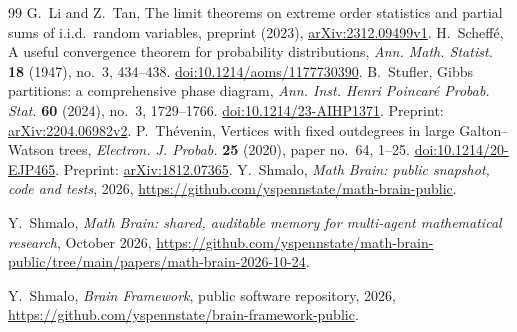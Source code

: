 \begin{thebibliography}{99}
 G.~Li and Z.~Tan, The limit theorems on extreme order statistics and partial sums of i.i.d.\ random variables, preprint (2023), \href{https://arxiv.org/abs/2312.09499v1}{arXiv:2312.09499v1}.
 H.~Scheff\'e, A useful convergence theorem for probability distributions, \emph{Ann. Math. Statist.} \textbf{18} (1947), no.~3, 434--438. \href{https://doi.org/10.1214/aoms/1177730390}{doi:10.1214/aoms/1177730390}.
 B.~Stufler, Gibbs partitions: a comprehensive phase diagram, \emph{Ann. Inst. Henri Poincar\'e Probab. Stat.} \textbf{60} (2024), no.~3, 1729--1766. \href{https://doi.org/10.1214/23-AIHP1371}{doi:10.1214/23-AIHP1371}. Preprint: \href{https://arxiv.org/abs/2204.06982}{arXiv:2204.06982v2}.
 P.~Th\'evenin, Vertices with fixed outdegrees in large Galton--Watson trees, \emph{Electron. J. Probab.} \textbf{25} (2020), paper no.~64, 1--25. \href{https://doi.org/10.1214/20-EJP465}{doi:10.1214/20-EJP465}. Preprint: \href{https://arxiv.org/abs/1812.07365}{arXiv:1812.07365}.
 Y.~Shmalo, \emph{Math Brain: public snapshot, code and tests}, 2026, \url{https://github.com/yspennstate/math-brain-public}.

 Y.~Shmalo, \emph{Math Brain: shared, auditable memory for multi-agent mathematical research}, October 2026, \url{https://github.com/yspennstate/math-brain-public/tree/main/papers/math-brain-2026-10-24}.

 Y.~Shmalo, \emph{Brain Framework}, public software repository, 2026, \url{https://github.com/yspennstate/brain-framework-public}.

\end{thebibliography}
